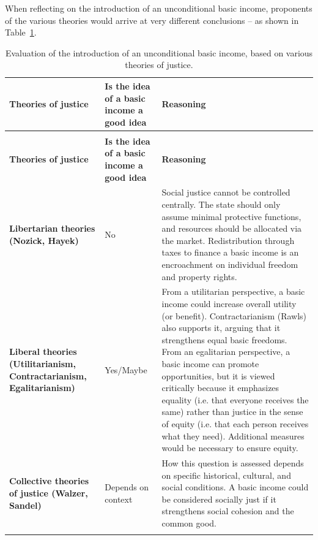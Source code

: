 \documentclass[
  a4paper,
  DIV=11,
  numbers=noendperiod,
  oneside,
  openany]{scrreprt}
\begin{document}
When reflecting on the introduction of an unconditional basic income,
proponents of the various theories would arrive at very different
conclusions -- as shown in Table~\ref{tbl-basic-income-justice}.

\begingroup\fontsize{9}{11}\selectfont

\begin{longtable}[t]{>{\raggedright\arraybackslash}p{3.2cm}>{\raggedright\arraybackslash}p{2.5cm}>{\raggedright\arraybackslash}p{9.3cm}}

\caption{\label{tbl-basic-income-justice}Evaluation of the introduction
of an unconditional basic income, based on various theories of justice.}

\tabularnewline

\toprule
\textbf{Theories of justice} & \textbf{Is the idea of a basic income a good idea} & \textbf{Reasoning}\\
\midrule
\endfirsthead
\multicolumn{3}{@{}l}{\textit{(continued)}}\\
\toprule
\textbf{Theories of justice} & \textbf{Is the idea of a basic income a good idea} & \textbf{Reasoning}\\
\midrule
\endhead

\endfoot
\bottomrule
\endlastfoot
\textbf{Libertarian theories (Nozick, Hayek)} & No & Social justice cannot be controlled centrally. The state should only assume minimal protective functions, and resources should be allocated via the market. Redistribution through taxes to finance a basic income is an encroachment on individual freedom and property rights.\\
\textbf{Liberal theories (Utilitarianism, Contractarianism, Egalitarianism)} & Yes/Maybe & From a utilitarian perspective, a basic income could increase overall utility (or benefit). Contractarianism (Rawls) also supports it, arguing that it strengthens equal basic freedoms. From an egalitarian perspective, a basic income can promote opportunities, but it is viewed critically because it emphasizes equality (i.e. that everyone receives the same) rather than justice in the sense of equity (i.e. that each person receives what they need). Additional measures would be necessary to ensure equity.\\
\textbf{Collective theories of justice (Walzer, Sandel)} & Depends on context & How this question is assessed depends on specific historical, cultural, and social conditions. A basic income could be considered socially just if it strengthens social cohesion and the common good.\\*

\end{longtable}
\end{document}
